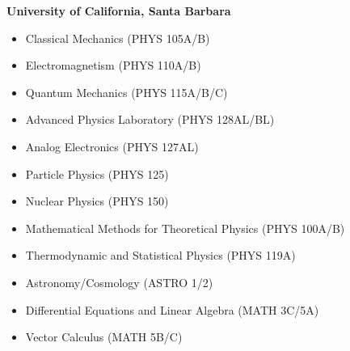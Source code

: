 \textbf{University of California, Santa Barbara}\\[-2.3ex]
\begin{itemize}[leftmargin=4ex] \itemsep -2pt
    \item Classical Mechanics ({\footnotesize{PHYS 105A/B}}) 
    \item Electromagnetism ({\footnotesize{PHYS 110A/B}})
    \item Quantum Mechanics ({\footnotesize{PHYS 115A/B/C}})
    \item Advanced Physics Laboratory ({\footnotesize{PHYS 128AL/BL}})
    \item Analog Electronics ({\footnotesize{PHYS 127AL}})
    \item Particle Physics ({\footnotesize{PHYS 125}})
    \item Nuclear Physics ({\footnotesize{PHYS 150}})
    \item Mathematical Methods for Theoretical Physics ({\footnotesize{PHYS 100A/B}})
    \item Thermodynamic and Statistical Physics ({\footnotesize{PHYS 119A}})
    \item Astronomy/Cosmology ({\footnotesize{ASTRO 1/2}})
    \item Differential Equations and Linear Algebra ({\footnotesize{MATH 3C/5A}})
    \item Vector Calculus ({\footnotesize{MATH 5B/C}})
\end{itemize}
